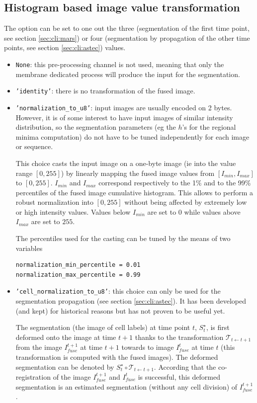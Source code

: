 \subsection{Histogram based image value transformation}

The option  can be set to one out the three (segmentation of the first time point, see section \ref{sec:cli:mars}) or four (segmentation by propagation of the other time points, see section \ref{sec:cli:astec}) values.
\begin{itemize}
\itemsep -0.5ex
\item \texttt{None}: this pre-processing channel is not used, meaning that only the membrane dedicated process will produce the input for the segmentation.
\item \texttt{'identity'}: there is no transformation of the fused image.
\item \texttt{'normalization\_to\_u8'}: input images are usually encoded on 2 bytes. However, it is of some interest to have input images of similar intensity distribution, so the segmentation parameters (eg the $h$'s for the regional minima computation) do not have to be tuned independently for each image or sequence.

This choice casts the input image on a one-byte image (ie into the value range $[0, 255]$) 
by linearly mapping the fused image values from $[I_{min}, I_{max}]$ to $[0, 255]$. $I_{min}$ and $I_{max}$ correspond respectively to the 1\% and to the 99\% percentiles of the fused image cumulative histogram. This allows to perform a robust normalization into $[0, 255]$ without being affected by extremely low or high intensity values.
Values below $I_{min}$ are set to $0$ while values above $I_{max}$ are set to $255$.

The percentiles used for the casting can be tuned by the means of two variables
\begin{verbatim}
normalization_min_percentile = 0.01
normalization_max_percentile = 0.99
\end{verbatim}

\item \texttt{'cell\_normalization\_to\_u8'}: this choice can only be used for the segmentation propagation (see section \ref{sec:cli:astec}). It has been developed (and kept) for historical reasons but has not proven to be useful yet. 
 
The segmentation (the image of cell labels) at time point $t$, $S^{\star}_t$, is first deformed onto the image at time $t+1$ thanks to the transformation $\mathcal{T}_{t \leftarrow t+1}$ from the image $I^{t+1}_{fuse}$ at time $t+1$ towards to image $I^{t}_{fuse}$ at time $t$ (this transformation is computed with the fused images). The deformed segmentation can be denoted by $S^{\star}_t \circ \mathcal{T}_{t \leftarrow t+1}$. 
According that the co-registration of the image $I^{t+1}_{fuse}$ and $I^{t}_{fuse}$ is successful, this deformed segmentation is an estimated segmentation (without any cell division) of $I^{t+1}_{fuse}$. 


\end{itemize}
